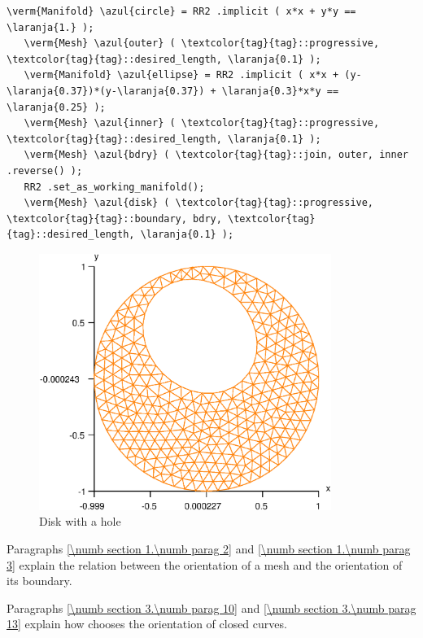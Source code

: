 \begin{Verbatim}[commandchars=\\\{\},formatcom=\small\tt,frame=single,
   label=parag-\ref{\numb section 3.\numb parag 3}.cpp,rulecolor=\color{coment},
   baselinestretch=0.94,framesep=2mm                                            ]
   \verm{Manifold} \azul{circle} = RR2 .implicit ( x*x + y*y == \laranja{1.} );
   \verm{Mesh} \azul{outer} ( \textcolor{tag}{tag}::progressive, \textcolor{tag}{tag}::desired_length, \laranja{0.1} );
   \verm{Manifold} \azul{ellipse} = RR2 .implicit ( x*x + (y-\laranja{0.37})*(y-\laranja{0.37}) + \laranja{0.3}*x*y == \laranja{0.25} );
   \verm{Mesh} \azul{inner} ( \textcolor{tag}{tag}::progressive, \textcolor{tag}{tag}::desired_length, \laranja{0.1} );
   \verm{Mesh} \azul{bdry} ( \textcolor{tag}{tag}::join, outer, inner .reverse() );
   RR2 .set_as_working_manifold();
   \verm{Mesh} \azul{disk} ( \textcolor{tag}{tag}::progressive, \textcolor{tag}{tag}::boundary, bdry, \textcolor{tag}{tag}::desired_length, \laranja{0.1} );
\end{Verbatim}

\begin{figure}[ht] \centering
 \includegraphics[width=95mm]{disk-with-hole}
  \caption{Disk with a hole}
  \label{\numb section 3.\numb fig 2}
\end{figure}

Paragraphs \ref{\numb section 1.\numb parag 2} and \ref{\numb section 1.\numb parag 3} explain
the relation between the orientation of a mesh and the orientation of its boundary.

Paragraphs \ref{\numb section 3.\numb parag 10} and \ref{\numb section 3.\numb parag 13}
explain how {\maniFEM} chooses the orientation of closed curves.


